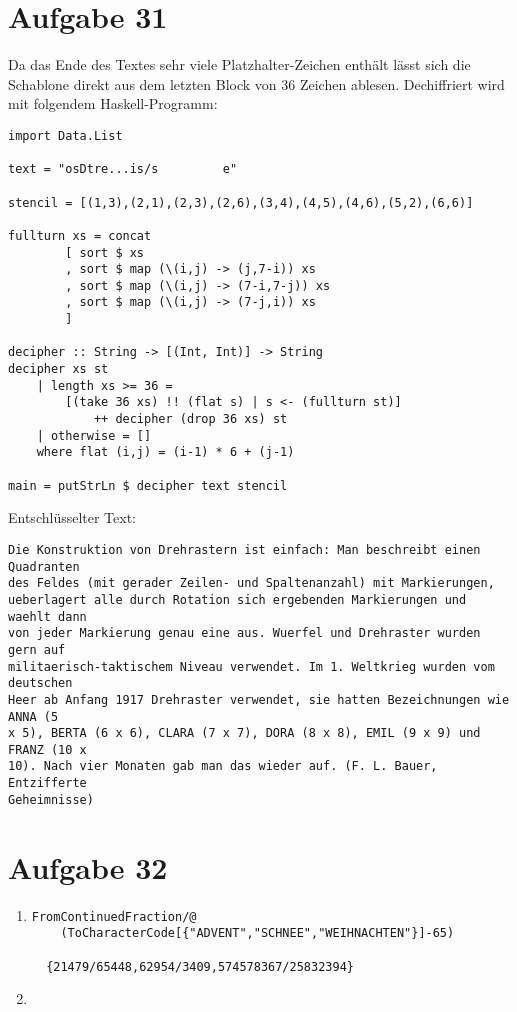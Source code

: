 \section*{Aufgabe 31}
Da das Ende des Textes sehr viele Platzhalter-Zeichen enthält lässt sich die
Schablone direkt aus dem letzten Block von $36$ Zeichen ablesen. Dechiffriert
wird mit folgendem Haskell-Programm:
\lstset{language=Haskell}
\begin{lstlisting}
import Data.List

text = "osDtre...is/s         e"

stencil = [(1,3),(2,1),(2,3),(2,6),(3,4),(4,5),(4,6),(5,2),(6,6)]

fullturn xs = concat
		[ sort $ xs
		, sort $ map (\(i,j) -> (j,7-i)) xs
		, sort $ map (\(i,j) -> (7-i,7-j)) xs
		, sort $ map (\(i,j) -> (7-j,i)) xs
		]

decipher :: String -> [(Int, Int)] -> String
decipher xs st
	| length xs >= 36 =
		[(take 36 xs) !! (flat s) | s <- (fullturn st)]
			++ decipher (drop 36 xs) st
	| otherwise = []
	where flat (i,j) = (i-1) * 6 + (j-1)

main = putStrLn $ decipher text stencil
\end{lstlisting}
Entschlüsselter Text:
\begin{verbatim}
Die Konstruktion von Drehrastern ist einfach: Man beschreibt einen Quadranten
des Feldes (mit gerader Zeilen- und Spaltenanzahl) mit Markierungen,
ueberlagert alle durch Rotation sich ergebenden Markierungen und waehlt dann
von jeder Markierung genau eine aus. Wuerfel und Drehraster wurden gern auf
militaerisch-taktischem Niveau verwendet. Im 1. Weltkrieg wurden vom deutschen
Heer ab Anfang 1917 Drehraster verwendet, sie hatten Bezeichnungen wie ANNA (5
x 5), BERTA (6 x 6), CLARA (7 x 7), DORA (8 x 8), EMIL (9 x 9) und FRANZ (10 x
10). Nach vier Monaten gab man das wieder auf. (F. L. Bauer, Entzifferte
Geheimnisse)
\end{verbatim}

\section*{Aufgabe 32}
\begin{enumerate}
	\item
	\lstset{language=Mathematica}
	\begin{lstlisting}
FromContinuedFraction/@
	(ToCharacterCode[{"ADVENT","SCHNEE","WEIHNACHTEN"}]-65)

  {21479/65448,62954/3409,574578367/25832394}
	\end{lstlisting}
	\item
\end{enumerate}


